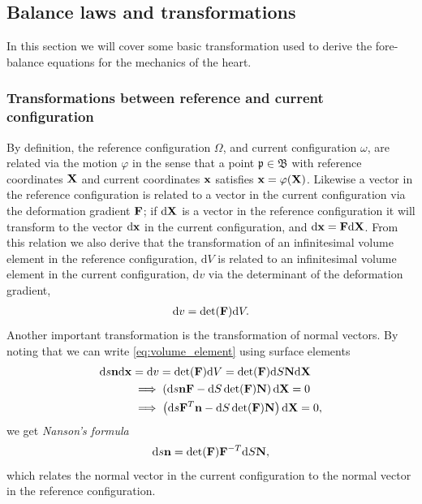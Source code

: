 \subsection{Balance laws and transformations}
In this section we will cover some basic transformation used to
derive the fore-balance equations for the mechanics of the heart. 

\subsubsection{Transformations between reference and current
  configuration}
By definition, the reference configuration $\Omega$, and current
configuration $\omega$, are related via the motion $\varphi$ in the
sense that a point $\mathfrak{p} \in \mathfrak{B}$ with reference
coordinates $\mathbf{X}$ and current coordinates $\mathbf{x}$ satisfies $\mathbf{x} =
\varphi(\mathbf{X})$. Likewise a vector in the reference configuration is
related to a vector in the current configuration  via the
deformation gradient $\mathbf{F}$; if $\mathrm{d}\mathbf{X}$ is a vector in the
reference configuration it will transform to the vector
$\mathrm{d}\mathbf{x}$ in the current configuration, and $\mathrm{d}\mathbf{x} =
\mathbf{F} \mathrm{d}\mathbf{X}$. From this relation we also derive that the
transformation of an infinitesimal volume element in the reference
configuration, $\mathrm{d}V$ is related to an infinitesimal volume
element in the current configuration, $\mathrm{d}v$  via the determinant of the
deformation gradient,
\begin{align}
  \mathrm{d}v =\det(\mathbf{F}) \mathrm{d}V.
  \label{eq:volume_element}
\end{align}
Another important transformation is the transformation of normal
vectors. By noting that we can write \eqref{eq:volume_element} using
surface elements
\begin{align*}
  \mathrm{d}s \mathbf{n} \mathrm{d}\mathbf{x}  &= \mathrm{d}v = \det(\mathbf{F}) \mathrm{d}V = \det(\mathbf{F}) \mathrm{d}S  \mathbf{N} \mathrm{d}\mathbf{X}\\
  &\implies \left( \mathrm{d}s \mathbf{n} \mathbf{F}  - \mathrm{d}S \det(\mathbf{F}) \mathbf{N} \right) \mathrm{d}\mathbf{X} = 0\\
  &\implies \left( \mathrm{d}s \mathbf{F}^T \mathbf{n}  - \mathrm{d}S \det(\mathbf{F}) \mathbf{N} \right) \mathrm{d}\mathbf{X} = 0,\\
\end{align*}
we get \emph{Nanson's formula}
\begin{align}
  \mathrm{d}s \mathbf{n}  =  \det(\mathbf{F}) \mathbf{F}^{-T} \mathrm{d}S \mathbf{N},
\end{align}
which relates the normal vector in the current configuration to the
normal vector in the reference configuration.


